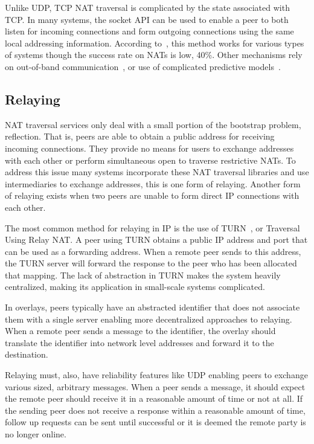 \documentclass[conference]{IEEEtran}
\begin{document}
Unlike UDP, TCP NAT traversal is complicated by the state associated with TCP.
In many systems, the socket API can be used to enable a peer to both listen for
incoming connections and form outgoing connections using the same local
addressing information.  According to~\cite{ice-tcp}, this method works for
various types of systems though the success rate on NATs is low, 40\%.  Other
mechanisms rely on out-of-band communication~\cite{pvc}, or use of complicated
predictive models~\cite{tcp-hole-punching}.

\subsection{Relaying}
\label{relay}

NAT traversal services only deal with a small portion of the bootstrap problem,
reflection.  That is, peers are able to obtain a public address for receiving
incoming connections.  They provide no means for users to exchange addresses
with each other or perform simultaneous open to traverse restrictive NATs.  To
address this issue many systems incorporate these NAT traversal libraries and
use intermediaries to exchange addresses, this is one form of relaying.
Another form of relaying exists when two peers are unable to form direct IP
connections with each other.

The most common method for relaying in IP is the use of TURN~\cite{turn}, or
Traversal Using Relay NAT.  A peer using TURN obtains a public IP address and
port that can be used as a forwarding address.  When a remote peer sends to
this address, the TURN server will forward the response to the peer who has
been allocated that mapping.  The lack of abstraction in TURN makes the system
heavily centralized, making its application in small-scale systems complicated.  

In overlays, peers typically have an abstracted identifier that does not
associate them with a single server enabling more decentralized approaches to
relaying.  When a remote peer sends a message to the identifier, the overlay
should translate the identifier into network level addresses and forward it to
the destination.

Relaying must, also, have reliability features like UDP enabling peers to
exchange various sized, arbitrary messages.  When a peer sends a message, it
should expect the remote peer should receive it in a reasonable amount of time
or not at all.  If the sending peer does not receive a response within a
reasonable amount of time, follow up requests can be sent until successful or
it is deemed the remote party is no longer online.  
\end{document}
